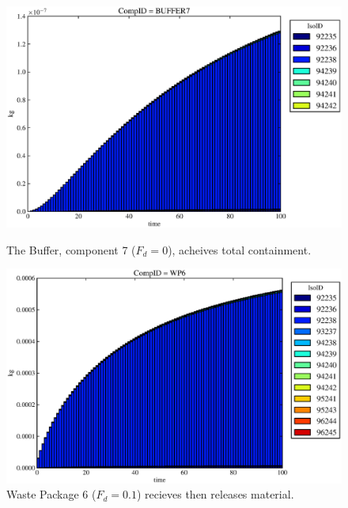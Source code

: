 \begin{figure}[ht]
\begin{minipage}[b]{0.45\linewidth}
  \includegraphics[width=\textwidth]{./chapters/demonstration/no_release/lpDMII3.eps}
  \caption[Case LPDMII Buffer Contaminants]{
    The Buffer, component 7 ($F_d=0$), acheives total containment.
    }
  \label{fig:lpDMIIbuff}

\end{minipage}
\hspace{0.05\linewidth}
\begin{minipage}[b]{0.45\linewidth}
  \includegraphics[width=\textwidth]{./chapters/demonstration/no_release/lpDMII2.eps}
  \caption[Case LPDMII Waste Package Contaminants.]{ 
    Waste Package 6 ($F_d = 0.1$) recieves then releases material. 
    }
  \label{fig:lpDMIIwp6}


\end{minipage}
\end{figure}

